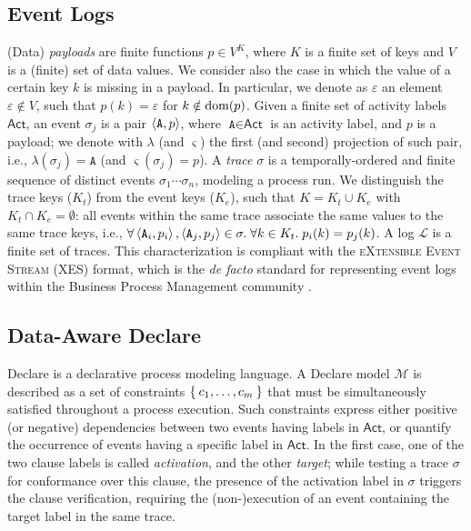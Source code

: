 \subsection{Event Logs}\label{ssec:elog}
(Data) \textit{payloads} are finite functions $p\in V^K$, where $K$ is a finite set of keys and $V$ is a (finite) set of data values. We consider also the case in which the value of a certain key $k$ is missing in a payload. In particular, we denote as $\varepsilon$ an element $\varepsilon\notin V$, such that $p(k)=\varepsilon$ for $k\notin\textup{dom}(p)$. Given a finite set of activity labels $\textsf{Act}$, an event $\sigma_j$ is a pair $\Braket{\texttt{A},p}$, where $\texttt{A}\in\textsf{Act}$ is an activity label, and $p$ is a payload; we denote with $\lambda$ (and $\varsigma$) the first (and second) projection of such pair, i.e., $\lambda(\sigma_j)=\texttt{A}$ (and $\varsigma(\sigma_j)=p$). A \textit{trace} $\sigma$ is a temporally-ordered and finite sequence of distinct events $\sigma_1\cdots\sigma_n$, modeling a process run. We distinguish the trace keys ($K_t$) from the event keys ($K_e$), such that $K=K_t\cup K_e$ with $K_t\cap K_e=\emptyset$: all events within the same trace associate the same values to the same trace keys, i.e., $\forall \Braket{\texttt{A}_i,p_i},\Braket{\texttt{A}_j,p_j}\in\sigma.\;\forall k\in K_t.\; p_i(k)=p_j(k)$. A log $\mathcal{L}$ is a finite set of traces. This  characterization is compliant with the \textsc{eXtensible Event Stream} (XES) format, which is the \textit{de facto} standard for representing event logs within the Business Process Management community \cite{XES}.


\subsection{Data-Aware Declare}\label{ssec:dad}
Declare is a declarative process modeling language. A Declare model $\mathcal{M}$ is described as a set of constraints $\Set{c_1,\dots,c_m}$ that must be simultaneously satisfied throughout a process execution.
Such constraints express either positive (or negative) dependencies between two events having labels in $\textsf{Act}$, or quantify the occurrence of events having a specific label in $\textsf{Act}$. In the first case, one of the two clause labels is called \textit{activation}, and the other \textit{target}; while testing a trace $\sigma$ for conformance over this clause, the presence of the activation label in $\sigma$ triggers the clause verification, requiring the (non-)execution of an event containing the target label in the same trace.

